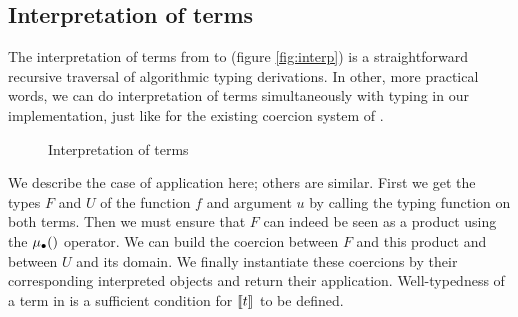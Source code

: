 \documentclass{llncs}
\def\figureshrink{0em}
\begin{document}
\subsection{Interpretation of terms}
The interpretation of terms from \Russell to \CICq (figure
\vref{fig:interp}) is a straightforward
recursive traversal of algorithmic typing derivations. In other, more
practical words, we can do interpretation of terms simultaneously with
typing in our implementation, just like for the existing coercion system
of \Coq. 
\begin{figure}[ht]
  \vspace{\figureshrink}
  \interparr
  \vspace{\figureshrink}
  \caption{Interpretation of terms}
  \label{fig:interp}
  \vspace{\figureshrink}
\end{figure}
We describe the case of application here; others are similar. First we
get the \Russell types $F$ and $U$ of the function $f$ and argument $u$ by calling the
typing function on both terms. Then we must ensure that $F$ can indeed
be seen as a product using the $\mualgo$ operator. We can build
the coercion between $F$ and this product and between $U$ and its
domain. We finally instantiate these coercions by their corresponding
interpreted objects and return their application.
Well-typedness of a term in \Russell is a sufficient condition for
$\llbracket t \rrbracket_{}$ to be defined.
\end{document}
